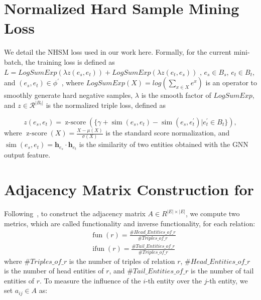

\section{Normalized Hard Sample Mining Loss}
\label{app:nhsm}
We detail the NHSM loss used in our work here.
 Formally, for the current mini-batch, the training loss is defined as
$L = LogSumExp(\lambda z(e_s, e_t)) + LogSumExp(\lambda z(e_t, e_s))$
, $e_s \in B_s$, $e_t \in B_t$, and $(e_s, e_t) \in \phi^{\prime}$
, where
$LogSumExp(X) = log(\sum_{x \in X}e^x)$
is an operator to smoothly generate hard negative samples,
$\lambda$ is the smooth factor of $LogSumExp$, and 
$z \in\mathcal{R}^{|B_t|}$ is the normalized triple loss, defined as

\vspace{-5mm}
\begin{equation}
z(e_{s}, e_{t}) =\operatorname{z-score}(\{\gamma+\operatorname{sim}(e_{s}, e_{t})-\operatorname{sim}(e_{s}, e_{t}^{\prime}) | e^{\prime}_t \in B_t\}),
\end{equation}
where $\operatorname{z-score}(X)=  \frac{X - \mu(X)}{\sigma(X)}$ is the standard score normalization,
and $\operatorname{sim}(e_{s}, e_{t})= \mathbf{h}_{e_s} \cdot \mathbf{h}_{e_t}$ is the similarity of two entities obtained with the GNN output feature.



\section{Adjacency Matrix Construction for \MetisGCN{}}
\label{app:adj-matrix}
Following~\cite{GCN-Align18}, to construct the adjacency matrix $A \in R^{|E|\times|E|}$, we compute two metrics, which are called functionality and inverse functionality, for each relation:
\begin{equation}
\begin{aligned}
&\operatorname{fun}(r)=\frac{\#  Head\_Entities\_of\_r }{\# Triples\_of\_r } \\
&\operatorname{ ifun }(r)=\frac{\# Tail\_Entities\_of\_r }{\#  Triples\_of\_r }
\end{aligned}
\end{equation}
where $\#Triples\_of\_r$ is the number of triples of relation $r$, $\#Head\_Entities\_of\_r$ is the number of head entities of $r$, and $\#Tail\_Entities\_of\_r$ is the number of tail entities of $r$. To measure the influence of the $i$-th entity over the $j$-th entity, we set $a_{i j} \in A$ as:

